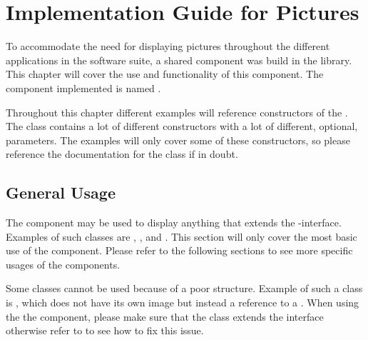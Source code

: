 
\chapter{Implementation Guide for Pictures}
\label{app:implementation_guide_for_pictures}

To accommodate the need for displaying pictures throughout the different applications in the \giraf software suite, a shared component was build in the \gc library. This chapter will cover the use and functionality of this component. The component implemented is named .


\begin{note}
    Throughout this chapter different examples will reference constructors of the . The class contains a lot of different constructors with a lot of different, optional, parameters. The examples will only cover some of these constructors, so please reference the documentation for the class if in doubt.
\end{note}

\section{General Usage}
\label{sec:general_usage}
The component may be used to display anything that extends the -interface. Examples of such classes are , , and . This section will only cover the most basic use of the component. Please refer to the following sections to see more specific usages of the components.


\begin{note}
    Some classes cannot be used because of a poor structure. Example of such a class is , which does not have its own image but instead a reference to a . When using the the component, please make sure that the class extends the  interface otherwise refer to  to see how to fix this issue.
\end{note}

